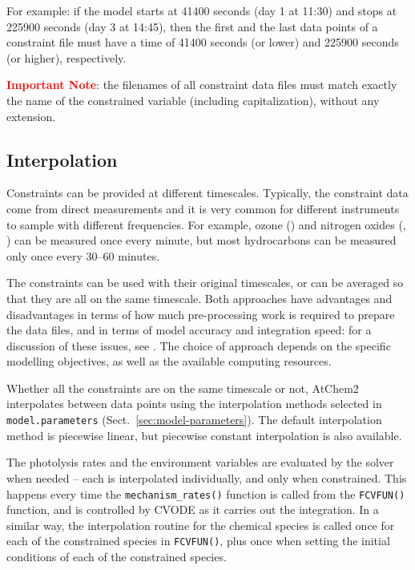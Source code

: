 For example: if the model starts at 41400 seconds (day 1 at 11:30) and stops at 225900 seconds
(day 3 at 14:45), then the first and the last data points of a constraint file must have a time
of 41400 seconds (or lower) and 225900 seconds (or higher), respectively.

\medskip \noindent
\textcolor{red}{\bf Important Note}: the filenames of all constraint data files must match
exactly the name of the constrained variable (including capitalization), without any extension.

\subsection{Interpolation} \label{subsec:interpolation}

Constraints can be provided at different timescales. Typically, the
constraint data come from direct measurements and it is very common
for different instruments to sample with different frequencies. For
example, ozone () and nitrogen oxides (, ) can
be measured once every minute, but most hydrocarbons can be measured
only once every 30--60 minutes.

The constraints can be used with their original timescales, or can be
averaged so that they are all on the same timescale. Both approaches
have advantages and disadvantages in terms of how much pre-processing
work is required to prepare the data files, and in terms of model
accuracy and integration speed: for a discussion of these issues, see
\citet{sommariva_2020}. The choice of approach depends on the specific
modelling objectives, as well as the available computing resources.

Whether all the constraints are on the same timescale or not, AtChem2
interpolates between data points using the interpolation methods
selected in \texttt{model.parameters} (Sect.~\ref{sec:model-parameters}).
The default interpolation method is piecewise linear, but piecewise
constant interpolation is also available.

The photolysis rates and the environment variables are evaluated by the
solver when needed -- each is interpolated individually, and only when
constrained. This happens every time the \texttt{mechanism\_rates()}
function is called from the \texttt{FCVFUN()} function, and is
controlled by CVODE as it carries out the integration. In a similar
way, the interpolation routine for the chemical species is called once
for each of the constrained species in \texttt{FCVFUN()}, plus once
when setting the initial conditions of each of the constrained
species.

